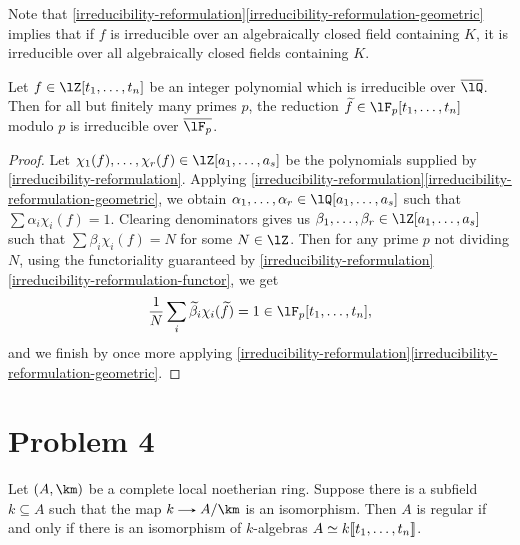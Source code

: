 \begin{remark}
  Note that \cref{irreducibility-reformulation}\cref{irreducibility-reformulation-geometric} implies that if $f$ is irreducible over an algebraically closed field containing $K$, it is irreducible over all algebraically closed fields containing $K$.
\end{remark}

\begin{proposition}
  \label{char-0-to-char-p}
  Let $f \in \lZ[t_1,\ldots,t_n]$ be an integer polynomial which is irreducible over $\o \lQ$. Then for all but finitely many primes $p$, the reduction $\til f \in \lF_p[t_1,\ldots,t_n]$ modulo $p$ is irreducible over $\o{\lF_p}$.
\end{proposition}

\begin{proof}
  Let $\chi_1(f),\ldots,\chi_r(f) \in \lZ[a_1,\ldots,a_s]$ be the polynomials supplied by \cref{irreducibility-reformulation}. Applying \cref{irreducibility-reformulation}\cref{irreducibility-reformulation-geometric},  we obtain $\alpha_1,\ldots,\alpha_r \in \lQ[a_1,\ldots,a_s]$ such that $\sum \alpha_i\chi_i(f) = 1$. Clearing denominators gives us $\beta_1,\ldots,\beta_r \in \lZ[a_1,\ldots,a_s]$ such that $\sum \beta_i\chi_i(f) = N$ for some $N \in \lZ$. Then for any prime $p$ not dividing $N$, using the functoriality guaranteed by \cref{irreducibility-reformulation}\cref{irreducibility-reformulation-functor}, we get
  \[
    \frac{1}{N} \sum_i \til\beta_i \chi_i(\til f) = 1 \in \lF_p[t_1,\ldots,t_n],
  \]
  and we finish by once more applying \cref{irreducibility-reformulation}\cref{irreducibility-reformulation-geometric}.
\end{proof}


\section{Problem 4}

\begin{proposition}
  Let $(A,\km)$ be a complete local noetherian ring. Suppose there is a subfield $k \subseteq A$ such that the map $k \to A/\km$ is an isomorphism. Then $A$ is regular if and only if there is an isomorphism of $k$-algebras $A \simeq k\llbracket t_1,\ldots,t_n \rrbracket$.
\end{proposition}


